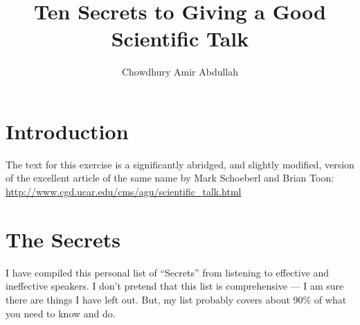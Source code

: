 \documentclass{article}
\title{Ten Secrets to Giving a Good Scientific Talk}
\author{Chowdhury Amir Abdullah}
\begin{document}
\maketitle


\section{Introduction}

The text for this exercise is a significantly abridged, and slightly modified, version of the excellent article of the same name by Mark Schoeberl and Brian Toon: \url{http://www.cgd.ucar.edu/cms/agu/scientific_talk.html}


\section{The Secrets}
\label{sec:method}

I have compiled this personal list of ``Secrets'' from listening to effective and ineffective speakers. I don’t pretend that this list is comprehensive — I am sure there are things I have left out. But, my list probably covers about 90\% of what you need to know and do.
\end{document}
